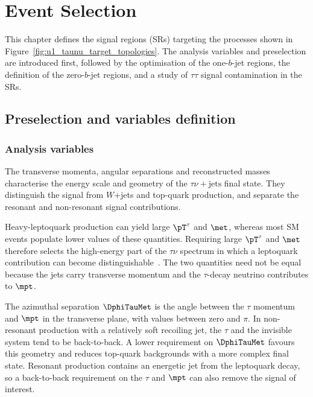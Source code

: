 \chapter{Event Selection}
\label{chapter:event_selection}

This chapter defines the signal regions (SRs) targeting the processes shown in Figure~\ref{fig:u1_taunu_target_topologies}.
The analysis variables and preselection are introduced first, followed by the optimisation of the one-$b$-jet regions, the definition of the zero-$b$-jet regions, and a study of $\tau\tau$ signal contamination in the SRs.

\section{Preselection and variables definition}
\label{sec:ch7_preselection}

\subsection{Analysis variables}
\label{subsec:ch7_variables}

The transverse momenta, angular separations and reconstructed masses characterise the energy scale and geometry of the $\tau\nu+\mathrm{jets}$ final state.
They distinguish the signal from $W$+jets and top-quark production, and separate the resonant and non-resonant signal contributions. 

Heavy-leptoquark production can yield large $\pT^\tau$ and $\met$, whereas most SM events populate lower values of these quantities.
    Requiring large $\pT^\tau$ and $\met$ therefore selects the high-energy part of the $\tau\nu$ spectrum in which a leptoquark contribution can become distinguishable~\cite{Endo2022NonResonant}.
    The two quantities need not be equal because the jets carry transverse momentum and the $\tau$-decay neutrino contributes to $\mpt$.

The azimuthal separation $\DphiTauMet$ is the angle between the $\tau$ momentum and $\mpt$ in the transverse plane, with values between zero and $\pi$.
    In non-resonant production with a relatively soft recoiling jet, the $\tau$ and the invisible system tend to be back-to-back.
    A lower requirement on $\DphiTauMet$ favours this geometry and reduces top-quark backgrounds with a more complex final state.
    Resonant production contains an energetic jet from the leptoquark decay, so a back-to-back requirement on the $\tau$ and $\mpt$ can also remove the signal of interest.

